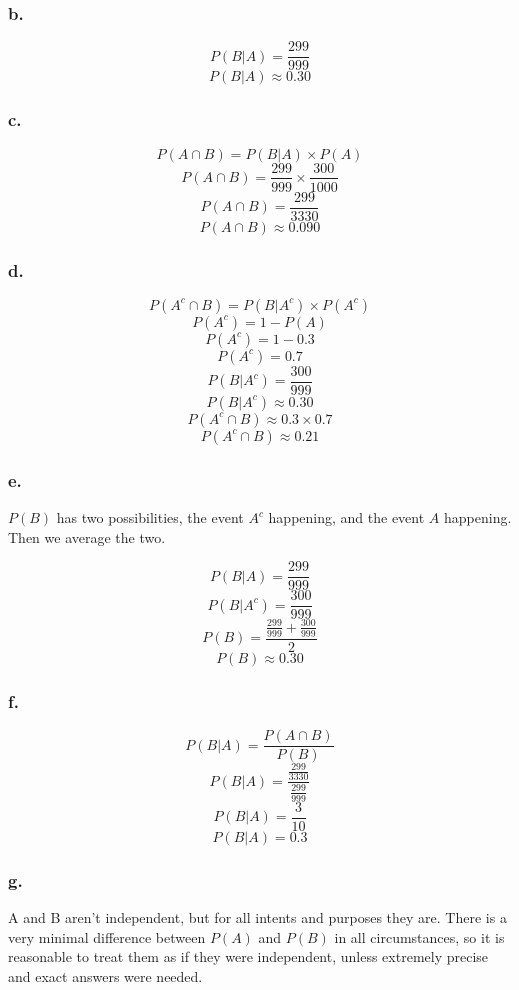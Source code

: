 \documentclass[11pt]{article}
\begin{document}
\subsubsection*{b.}
\[ P(B|A) = \frac{299}{999} \]
\[ P(B|A) \approx 0.30 \]

\subsubsection*{c.}
\[ P(A \cap B) = P(B|A) \times P(A) \]
\[ P(A \cap B) = \frac{299}{999} \times \frac{300}{1000} \]
\[ P(A \cap B) = \frac{299}{3330} \]
\[ P(A \cap B) \approx 0.090 \]

\subsubsection*{d.}
\[ P(A^c \cap B) = P(B|A^c) \times P(A^c) \]
\[ P(A^c) = 1 - P(A) \]
\[ P(A^c) = 1 - 0.3 \]
\[ P(A^c) = 0.7 \]
\[ P(B|A^c) = \frac{300}{999} \]
\[ P(B|A^c) \approx 0.30 \]
\[ P(A^c \cap B) \approx 0.3 \times 0.7 \]
\[ P(A^c \cap B) \approx 0.21 \]

\subsubsection*{e.}
$P(B)$ has two possibilities, the event $A^c$ happening, and the event $A$
happening. Then we average the two.

\[ P(B|A) = \frac{299}{999} \]
\[ P(B|A^c) = \frac{300}{999} \]
\[ P(B) = \frac{\frac{299}{999} + \frac{300}{999}}{2} \]
\[ P(B) \approx 0.30 \]


\subsubsection*{f.}
\[ P(B|A) = \frac{P(A \cap B)}{P(B)} \]
\[ P(B|A) = \frac{\frac{299}{3330}}{\frac{299}{999}} \]
\[ P(B|A) = \frac{3}{10} \]
\[ P(B|A) = 0.3 \]

\subsubsection*{g.}
A and B aren't independent, but for all intents and purposes they are. There is
a very minimal difference between $P(A)$ and $P(B)$ in all circumstances, so it
is reasonable to treat them as if they were independent, unless extremely
precise and exact answers were needed. 
\end{document}
